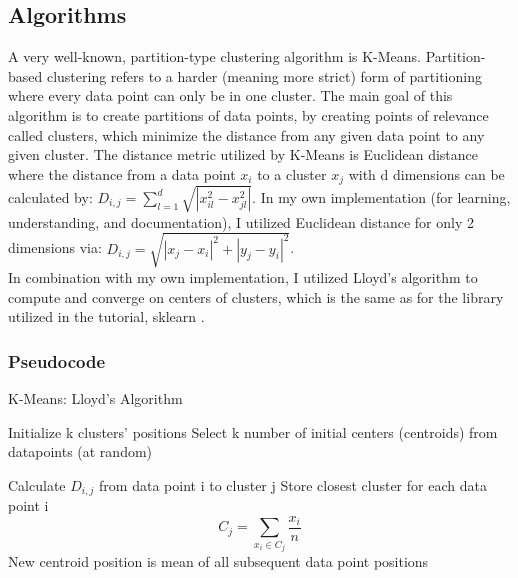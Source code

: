 \documentclass[10pt,twocolumn]{article}
\begin{document}
\subsection {Algorithms}

\indent A very well-known, partition-type clustering algorithm is K-Means. Partition-based clustering refers to a harder (meaning more strict) form of partitioning where every data point can only be in one cluster. The main goal of this algorithm is to create partitions of data points, by creating points of relevance called clusters, which minimize the distance from any given data point to any given cluster. The distance metric utilized by K-Means is Euclidean distance where the distance from a data point \(x_i\) to a cluster \(x_j \) with d dimensions can be calculated by:
\(D_{i, j} = \sum_{l=1}^d \sqrt{|x_{il}^2 - x_{jl}^2|} \). In my own implementation (for learning, understanding, and documentation), I utilized Euclidean distance for only 2 dimensions via: \(D_{i, j} = \sqrt{{|x_{j} - x_{i}|^2} + {|y_{j} - y_{i}|^2}} \). \\ In combination with my own implementation, I utilized Lloyd’s algorithm to compute and converge on centers of clusters, which is the same as for the library utilized in the tutorial, sklearn \cite{skLearnKMeans2020}.

\subsubsection {Pseudocode}

\begin{algorithm}
  \caption{ K-Means: Lloyd's Algorithm }
  \begin{algorithmic}[1]
    \State Initialize k clusters' positions
    \State Select k number of initial centers (centroids) from datapoints (at random)

      \State Calculate \(D_{i, j}\) from data point i to cluster j
      \EndFor 
      \State Store closest cluster for each data point i
      \EndFor
      \State $$C_j = \sum_{x_i \in C_j} \frac{x_i}{n}$$
      New centroid position is mean of all subsequent data point positions
    \EndWhile
  \end{algorithmic}

\end{algorithm}
\end{document}
